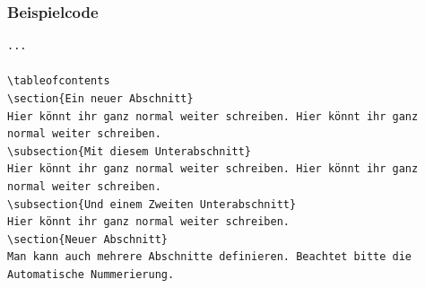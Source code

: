 \begin{frame}[fragile]
\frametitle{Beispielcode}
\begin{lstlisting}[style=Latex]
...

\tableofcontents
\section{Ein neuer Abschnitt}
Hier könnt ihr ganz normal weiter schreiben. Hier könnt ihr ganz normal weiter schreiben. 
\subsection{Mit diesem Unterabschnitt}
Hier könnt ihr ganz normal weiter schreiben. Hier könnt ihr ganz normal weiter schreiben.
\subsection{Und einem Zweiten Unterabschnitt}
Hier könnt ihr ganz normal weiter schreiben.
\section{Neuer Abschnitt}
Man kann auch mehrere Abschnitte definieren. Beachtet bitte die Automatische Nummerierung. 

\end{lstlisting} 
\end{frame}


